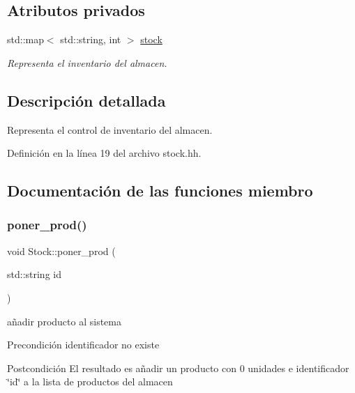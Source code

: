 \subsection*{Atributos privados}
\begin{DoxyCompactItemize}
\item 
std\+::map$<$ std\+::string, int $>$ \mbox{\hyperlink{class_stock_a55cb69748a14da5fe525e55a2c656ba9}{stock}}
\begin{DoxyCompactList}\small\item\em Representa el inventario del almacen. \end{DoxyCompactList}\end{DoxyCompactItemize}


\subsection{Descripción detallada}
Representa el control de inventario del almacen. 

Definición en la línea 19 del archivo stock.\+hh.



\subsection{Documentación de las funciones miembro}
\mbox{\label{class_stock_a06c7f65bcdd419950fa2c00fd638c03b}} 
\subsubsection{\texorpdfstring{poner\+\_\+prod()}{poner\_prod()}}
{\footnotesize\ttfamily void Stock\+::poner\+\_\+prod (\begin{DoxyParamCaption}\item[{std\+::string}]{id }\end{DoxyParamCaption})}



añadir producto al sistema 

\begin{DoxyPrecond}{Precondición}
identificador no existe 
\end{DoxyPrecond}
\begin{DoxyPostcond}{Postcondición}
El resultado es añadir un producto con 0 unidades e identificador \char`\"{}id\char`\"{} a la lista de productos del almacen 
\end{DoxyPostcond}


